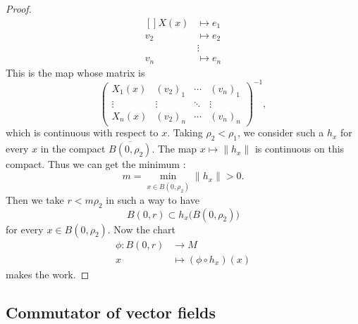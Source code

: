 \begin{proof}
	\begin{equation}
		\begin{aligned}[]
			X(x) & \mapsto e_1 \\
			v_2  & \mapsto e_2 \\
			     & \vdots      \\
			v_n  & \mapsto e_n
		\end{aligned}
	\end{equation}
	This is the map whose matrix is
	\begin{equation}
		\begin{pmatrix}
			X_1(x) & (v_2)_1 & \cdots & (v_n)_1 \\
			\vdots & \vdots  & \ddots & \vdots  \\
			X_n(x) & (v_2)_n & \cdots & (v_n)_n
		\end{pmatrix}^{-1},
	\end{equation}
	which is continuous with respect to \( x\). Taking \( \rho_2<\rho_1\), we consider such a \( h_x\) for every \( x\) in the compact \( \overline{B(0,\rho_2)}\). The map \( x\mapsto \| h_x \|\) is continuous on this compact. Thus we can get the minimum :
	\begin{equation}
		m=\min_{x\in\overline{B(0,\rho_2)}}\| h_x \|>0.
	\end{equation}
	Then we take \( r<m\rho_2\) in such a way to have
	\begin{equation}
		B(0,r)\subset h_x\big( B(0,\rho_2) \big)
	\end{equation}
	for every \( x\in B(0,\rho_2)\). Now the chart
	\begin{equation}
		\begin{aligned}
			\phi\colon B(0,r) & \to M                      \\
			x                 & \mapsto (\phi\circ h_x)(x)
		\end{aligned}
	\end{equation}
	makes the work.
\end{proof}

\subsection{Commutator of vector fields}


